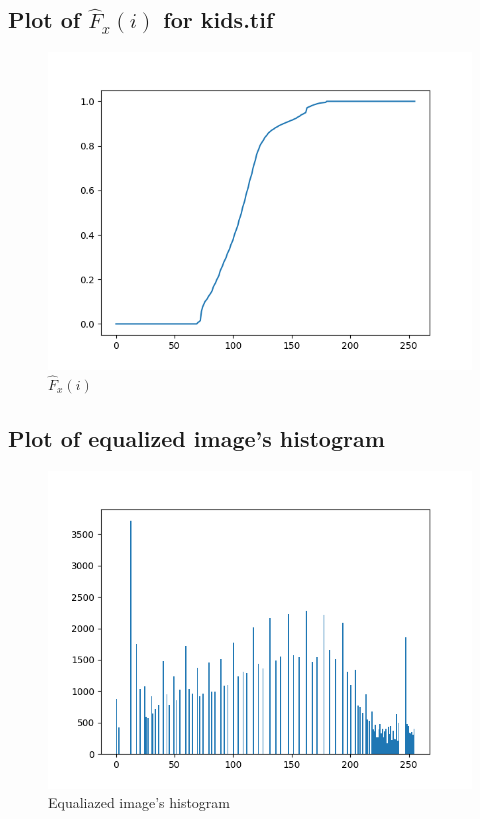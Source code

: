 \documentclass{article}
\begin{document}
\subsection{Plot of $\hat{F}_x(i)$ for kids.tif}
\begin{figure}[H]
    \centering
    \includegraphics[width=1\textwidth]{../kids-fx.png}
    \caption{$\hat{F}_x(i)$}
\end{figure}
\subsection{Plot of equalized image's histogram}
\begin{figure}[H]
    \centering
    \includegraphics[width=1\textwidth]{../kids-equalized-histogram.png}
    \caption{Equaliazed image's histogram}
\end{figure}
\end{document}
